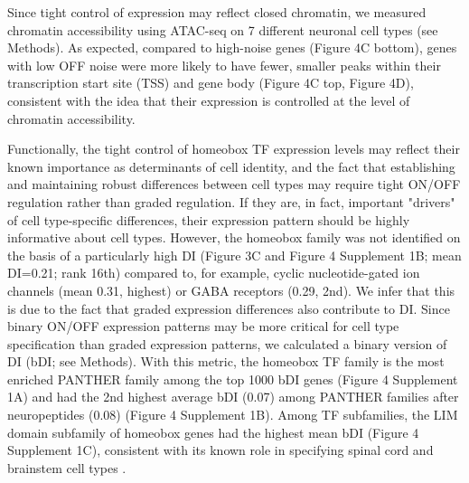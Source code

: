 Since tight control of expression may reflect closed chromatin, we measured chromatin accessibility using ATAC-seq \citep{Buenrostro_2013} on 7 different neuronal cell types (see Methods). As expected, compared to high-noise genes (Figure 4C bottom), genes with low OFF noise were more likely to have fewer, smaller peaks within their transcription start site (TSS) and gene body (Figure 4C top, Figure 4D), consistent with the idea that their expression is controlled at the level of chromatin accessibility.

Functionally, the tight control of homeobox TF expression levels may reflect their known importance as determinants of cell identity, and the fact that establishing and maintaining robust differences between cell types may require tight ON/OFF regulation rather than graded regulation. If they are, in fact, important "drivers" of cell type-specific differences, their expression pattern should be highly informative about cell types. However, the homeobox family was not identified on the basis of a particularly high DI (Figure 3C and Figure 4 Supplement 1B; mean DI=0.21; rank 16th) compared to, for example, cyclic nucleotide-gated ion channels (mean 0.31, highest) or GABA receptors (0.29, 2nd). We infer that this is due to the fact that graded expression differences also contribute to DI. Since binary ON/OFF expression patterns may be more critical for cell type specification than graded expression patterns, we calculated a binary version of DI (bDI; see Methods). With this metric, the homeobox TF family is the most enriched PANTHER family among the top 1000 bDI genes (Figure 4 Supplement 1A) and had the 2nd highest average bDI (0.07) among PANTHER families after neuropeptides (0.08) (Figure 4 Supplement 1B). Among TF subfamilies, the LIM domain subfamily of homeobox genes had the highest mean bDI (Figure 4 Supplement 1C), consistent with its known role in specifying spinal cord and brainstem cell types \citep{Dasen_2009,Philippidou_2013}. 

